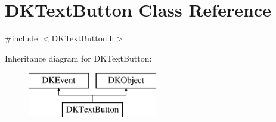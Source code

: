 \hypertarget{class_d_k_text_button}{\section{D\-K\-Text\-Button Class Reference}
\label{class_d_k_text_button}
}


{\ttfamily \#include $<$D\-K\-Text\-Button.\-h$>$}

Inheritance diagram for D\-K\-Text\-Button\-:\begin{figure}[H]
\begin{center}
\leavevmode
\includegraphics[height=2.000000cm]{class_d_k_text_button}
\end{center}
\end{figure}
